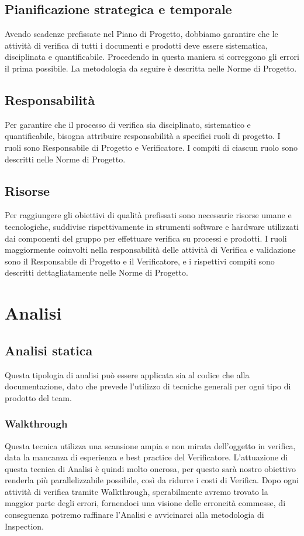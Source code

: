\subsection{Pianificazione strategica e temporale} %
\label{2.6}
Avendo scadenze prefissate nel Piano di Progetto, dobbiamo garantire che le attività di verifica di tutti i documenti e prodotti deve essere sistematica, disciplinata e quantificabile. Procedendo in questa maniera si correggono gli errori il prima possibile.
La metodologia da seguire è descritta nelle Norme di Progetto.

\subsection{Responsabilità} %
\label{2.7}
Per garantire che il processo di verifica sia disciplinato, sistematico e quantificabile, bisogna attribuire responsabilità a specifici ruoli di progetto. I ruoli sono Responsabile di Progetto e Verificatore. I compiti di ciascun ruolo sono descritti nelle Norme di Progetto.

\subsection{Risorse} %
\label{2.8}
Per raggiungere gli obiettivi di qualità prefissati sono necessarie risorse umane e tecnologiche, suddivise rispettivamente in strumenti software e hardware utilizzati dai componenti del gruppo per effettuare verifica su processi e prodotti. I ruoli maggiormente coinvolti nella responsabilità delle attività di Verifica e validazione sono il Responsabile di Progetto e il Verificatore, e i rispettivi compiti sono descritti dettagliatamente nelle Norme di Progetto.

\newpage
\section{Analisi} %
\label{3.0}

\subsection{Analisi statica}
\label{3.1}
Questa tipologia di analisi può essere applicata sia al codice che alla documentazione, dato che prevede l'utilizzo di tecniche generali per ogni tipo di prodotto del team.

\subsubsection{Walkthrough}
\label{3.1.1}
Questa tecnica utilizza una scansione ampia e non mirata dell'oggetto in verifica, data la mancanza di esperienza e best practice del Verificatore.
L'attuazione di questa tecnica di Analisi è quindi molto onerosa, per questo sarà nostro obiettivo renderla più parallelizzabile possibile, così da ridurre i costi di Verifica. 
Dopo ogni attività di verifica tramite Walkthrough, sperabilmente avremo trovato la maggior parte degli errori, fornendoci una visione delle erroneità commesse, di conseguenza potremo raffinare l'Analisi e avvicinarci alla metodologia di Inspection. 

